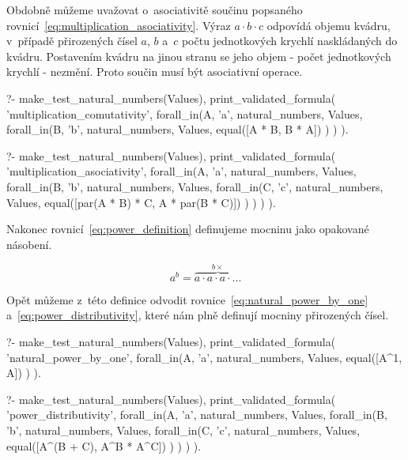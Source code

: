 Obdobně můžeme uvažovat o~asociativitě součinu popsaného rovnicí~\eqref{eq:multiplication_asociativity}. Výraz \(a \cdot b \cdot c\) odpovídá objemu kvádru, v~případě přirozených čísel \(a\), \(b\) a~\(c\) počtu jednotkových krychlí naskládaných do kvádru. Postavením kvádru na jinou stranu se jeho objem - počet jednotkových krychlí - nezmění. Proto součin musí být asociativní operace.

\begin{fact}
\begin{prolog}
?-	make_test_natural_numbers(Values),
	print_validated_formula(
		'multiplication_comutativity',
		forall_in(A, 'a', natural_numbers, Values,
			forall_in(B, 'b', natural_numbers, Values,
				equal([A * B, B * A])
			)
		)
	).				
\end{prolog}
\begin{prolog}
?-	make_test_natural_numbers(Values),
	print_validated_formula(
		'multiplication_asociativity',
		forall_in(A, 'a', natural_numbers, Values,
			forall_in(B, 'b', natural_numbers, Values,
				forall_in(C, 'c', natural_numbers, Values,
					equal([par(A * B) * C, A * par(B * C)])
				)
			)
		)
	).				
\end{prolog}
\end{fact}

Nakonec rovnicí~\eqref{eq:power_definition} definujeme mocninu jako opakované násobení.

\begin{equation}
\label{eq:power_definition}
a^b = \overbrace{a \cdot a \cdot a \cdot ...}^{b \times}
\end{equation}

Opět můžeme z~této definice odvodit rovnice~\eqref{eq:natural_power_by_one} a~\eqref{eq:power_distributivity}, které nám plně definují mocniny přirozených čísel.

\begin{fact}
\begin{prolog}
?-	make_test_natural_numbers(Values),
	print_validated_formula(
		'natural_power_by_one',
		forall_in(A, 'a', natural_numbers, Values,
			equal([A^1, A])
		)
	).				
\end{prolog}
\begin{prolog}
?-	make_test_natural_numbers(Values),
	print_validated_formula(
		'power_distributivity',
		forall_in(A, 'a', natural_numbers, Values,
			forall_in(B, 'b', natural_numbers, Values,
				forall_in(C, 'c', natural_numbers, Values,
					equal([A^(B + C), A^B * A^C])
				)
			)
		)
	).				
\end{prolog}
\end{fact}

